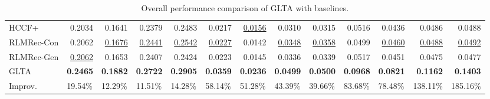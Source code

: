 \begin{table}[]
{\begin{tabular}{l|rrrr|rrrr|rrrr}
HCCF+      & 0.2034                      & 0.1641                      & 0.2379                      & 0.2483                       & 0.0217                      & \uline{0.0156}                & 0.0310                      & 0.0315                       & 0.0516                      & 0.0436                      & 0.0486                       & 0.0488                       \\
RLMRec-Con & 0.2062                      & \uline{0.1676}                & \uline{0.2441}                & \uline{0.2542}                 & \uline{0.0227}                & 0.0142                      & \uline{0.0348}                & \uline{0.0358}                 & 0.0499                      & \uline{0.0460}                & \uline{0.0488}                 & \uline{0.0492}                 \\
RLMRec-Gen & \uline{0.2062}                & 0.1653                      & 0.2407                      & 0.2424                       & 0.0223                      & 0.0145                      & 0.0336                      & 0.0339                       & 0.0517                      & 0.0451                      & 0.0475                       & 0.0477                       \\ \hline
GLTA      & \textbf{0.2465}             & \textbf{0.1882}             & \textbf{0.2722}             & \textbf{0.2905}              & \textbf{0.0359}             & \textbf{0.0236}             & \textbf{0.0499}             & \textbf{0.0500}              & \textbf{0.0968}             & \textbf{0.0821}             & \textbf{0.1162}              & \textbf{0.1403}              \\ \hline
Improv.    & \multicolumn{1}{l}{19.54\%} & \multicolumn{1}{l}{12.29\%} & \multicolumn{1}{l}{11.51\%} & \multicolumn{1}{l|}{14.28\%} & \multicolumn{1}{l}{58.14\%} & \multicolumn{1}{l}{51.28\%} & \multicolumn{1}{l}{43.39\%} & \multicolumn{1}{l|}{39.66\%} & \multicolumn{1}{l}{83.68\%} & \multicolumn{1}{l}{78.48\%} & \multicolumn{1}{l}{138.11\%} & \multicolumn{1}{l}{185.16\%} \\ \hline
\end{tabular}
}
\caption{Overall performance comparison of GLTA with baselines.}\label{tab:overall}
\end{table}

